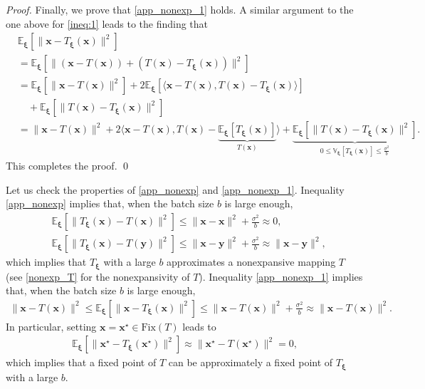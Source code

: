 \documentclass[smallextended,referee,envcountsect,]{svjour3}
\begin{document}
\begin{proof}
Finally, we prove that \eqref{app_nonexp_1} holds. A similar argument to the one above for \eqref{ineq:1} leads to the finding that 
\begin{align*}
&\mathbb{E}_{\bm{\xi}} \left[ \| \bm{x} - T_{\bm{\xi}}(\bm{x}) \|^2 \right]\\
&= 
\mathbb{E}_{\bm{\xi}} \left[ \| (\bm{x} - T(\bm{x})) 
+ (T(\bm{x}) - T_{\bm{\xi}} (\bm{x})) \|^2 \right]\\
&=
\mathbb{E}_{\bm{\xi}} \left[ \| \bm{x} - T(\bm{x}) \|^2 \right]
+ 2 \mathbb{E}_{\bm{\xi}} \left[ \langle \bm{x} - T(\bm{x}), T(\bm{x}) - T_{\bm{\xi}} (\bm{x}) \rangle \right]\\
&\quad + 
\mathbb{E}_{\bm{\xi}} \left[ \| T(\bm{x}) - T_{\bm{\xi}} (\bm{x})  \|^2 \right]\\
&=
\| \bm{x} - T(\bm{x}) \|^2
+ 2  \langle \bm{x} - T(\bm{x}), T(\bm{x}) - \underbrace{\mathbb{E}_{\bm{\xi}} \left[T_{\bm{\xi}} (\bm{x}) \right]}_{T(\bm{x})} \rangle 
+ 
\underbrace{\mathbb{E}_{\bm{\xi}} \left[ \| T(\bm{x}) - T_{\bm{\xi}} (\bm{x})  \|^2 \right]}_{0 \leq \mathbb{V}_{\bm{\xi}}[T_{\bm{\xi}} (\bm{x})] \leq \frac{\sigma^2}{b}}.
\end{align*}
This completes the proof.
\qed
\end{proof}

Let us check the properties of \eqref{app_nonexp} and \eqref{app_nonexp_1}. Inequality \eqref{app_nonexp} implies that, when the batch size $b$ is large enough,
\begin{align*}
&\mathbb{E}_{\bm{\xi}} \left[ \| T_{\bm{\xi}}(\bm{x}) - T(\bm{x}) \|^2 \right]
\leq 
\|\bm{x} - \bm{x} \|^2 
+ 
\frac{\sigma^2}{b}
\approx 
0,\\
&\mathbb{E}_{\bm{\xi}} \left[ \| T_{\bm{\xi}}(\bm{x}) - T(\bm{y}) \|^2 \right]
\leq 
\|\bm{x} - \bm{y} \|^2 
+ 
\frac{\sigma^2}{b}
\approx 
\|\bm{x} - \bm{y} \|^2,
\end{align*}
which implies that $T_{\bm{\xi}}$ with a large $b$ approximates a nonexpansive mapping $T$ (see \eqref{nonexp_T} for the nonexpansivity of $T$). Inequality \eqref{app_nonexp_1} implies that, when the batch size $b$ is large enough,
\begin{align*} 
\|\bm{x} - T (\bm{x})\|^2
\leq
\mathbb{E}_{\bm{\xi}} \left[ \| \bm{x} - T_{\bm{\xi}}(\bm{x}) \|^2 \right] 
\leq \|\bm{x} - T (\bm{x})\|^2 + \frac{\sigma^2}{b} \approx \|\bm{x} - T (\bm{x})\|^2.
\end{align*}
In particular, setting $\bm{x} = \bm{x}^\star \in \mathrm{Fix}(T)$ leads to
\begin{align*}
\mathbb{E}_{\bm{\xi}} \left[ \| \bm{x}^\star - T_{\bm{\xi}}(\bm{x}^\star) \|^2 \right] 
\approx \|\bm{x}^\star - T (\bm{x}^\star)\|^2 = 0,
\end{align*}
which implies that a fixed point of $T$ can be approximately a fixed point of $T_{\bm{\xi}}$ with a large $b$.
\end{document}
